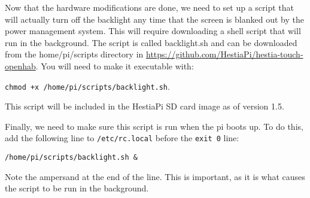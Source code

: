 Now that the hardware modifications are done, we need to set up a script that
will actually turn off the backlight any time that the screen is blanked out by
the power management system. This will require downloading a shell script that
will run in the background. The script is called backlight.sh and can be
downloaded from the home/pi/scripts directory in
\url{https://github.com/HestiaPi/hestia-touch-openhab}. You will need to make
it executable with:

\texttt{chmod +x /home/pi/scripts/backlight.sh}.

This script will be included in the HestiaPi SD card image as of version 1.5.

Finally, we need to make sure this script is run when the pi boots up. To do
this, add the following line to \texttt{/etc/rc.local} before the
\texttt{exit 0} line:

\texttt{/home/pi/scripts/backlight.sh \&}

Note the ampersand at the end of the line. This is important, as it is what
causes the script to be run in the background.
